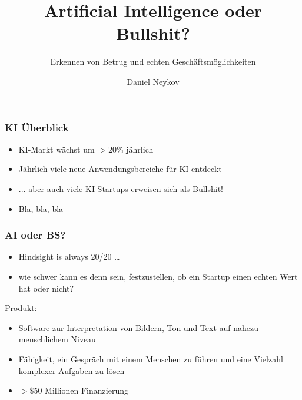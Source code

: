 \documentclass[handout]{beamer}
\title{Artificial Intelligence oder Bullshit?}
\subtitle{Erkennen von Betrug und echten Geschäftsmöglichkeiten}
\author{Daniel Neykov}
\begin{document}
\frame{\titlepage}

\begin{frame}
\frametitle{KI Überblick}

\begin{itemize}
    \item<1-> KI-Markt wächst um $>20\%$ jährlich
    \item<2-> Jährlich viele neue Anwendungsbereiche für KI entdeckt
    \item<3-> ... aber auch viele KI-Startups erweisen sich als Bullshit!
    \item<4-> Bla, bla, bla
\end{itemize}
\end{frame}

\begin{frame}
    \frametitle{AI oder BS?}
    \begin{itemize}
        \item<1-> Hindsight is always 20/20 \dots
        \item<2-> wie schwer kann es denn sein, festzustellen, ob ein Startup einen echten Wert hat oder nicht?
    \end{itemize}
\end{frame}

\begin{frame}
    Produkt: \\
    \begin{itemize}
        \item<1-> Software zur Interpretation von Bildern, Ton und Text auf nahezu menschlichem Niveau
        \item<2-> Fähigkeit, ein Gespräch mit einem Menschen zu führen und eine Vielzahl komplexer Aufgaben zu lösen
        \item<3-> $>\$50$ Millionen Finanzierung
    \end{itemize} ~\\
\end{frame}
\end{document}
